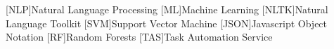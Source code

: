 \documentclass[a4paper,11pt,svgnames]{book}
\begin{document}
	[NLP]{Natural Language Processing}
	[ML]{Machine Learning}
	[NLTK]{Natural Language Toolkit}
	[SVM]{Support Vector Machine}
	[JSON]{Javascript Object Notation}
	[RF]{Random Forests}
	[TAS]{Task Automation Service}
	\newcommand\litem[1]{\item{\bfseries #1 }}
	\renewcommand{\arraystretch}{1.5} %
	
	\newcommand\headcell[1]{%
	  \multicolumn{1}{|c|}{\cellcolor{DodgerBlue}\bfseries\sffamily\textcolor{white}{#1}}
	}
	
	
	
	
		
	
	
	
	
	
	
	
	
	\pagestyle{fancy}
	\fancyhf{}
	\fancyhead[RO]{\sffamily \slshape \rightmark}
	\fancyhead[LE]{\sffamily \slshape \leftmark}
	\fancyfoot[OR,EL]{\rmfamily \thepage} %
	
	
	
	
	
	
	
	
	
	
	
	\appendix
	
	\nocite{*}
	
	{
	\small
	
	}
	
\end{document}
